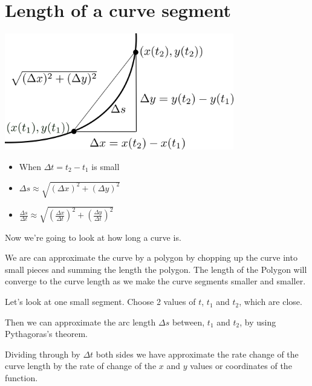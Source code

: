 \documentclass[12pt]{article} %
\theoremstyle{definition}
\theoremstyle{theorem}
\begin{document}
\section{Length of a curve segment}
\begin{tcolorbox}
	\begin{minipage}{\linewidth}
		\centering
		\includegraphics[width=100mm]{curve_length_2.png}
	\end{minipage}
	\begin{itemize}
		\item When $\Delta t = t_2 - t_1$ is small
		\item $\Delta s \approx	\sqrt{\left(\Delta x\right)^2 + \left(\Delta y\right)^2} $
		\item $\frac{\Delta s}{\Delta t} \approx	\sqrt{\left(\frac{\Delta x}{\Delta t}\right)^2 + \left(\frac{\Delta y}{\Delta t}\right)^2 } $
	\end{itemize}
\end{tcolorbox}

Now we're going to look at how long a curve is. 

We are can approximate the curve by a polygon by chopping up the curve into small pieces and summing the length the polygon. The length of the Polygon will converge to the curve length as we make the curve segments smaller and smaller.

Let's look at one small segment.  Choose 2 values of $t$,  $t_1$ and $t_2$, which are close. 

Then we can approximate the arc length $\Delta s$ between,  $t_1$ and $t_2$, by using Pythagoras’s theorem.

Dividing through by $\Delta t$ both sides we have approximate the rate change of the curve length by the rate of change of the $x$ and $y$ values or coordinates of the function.
\end{document}
